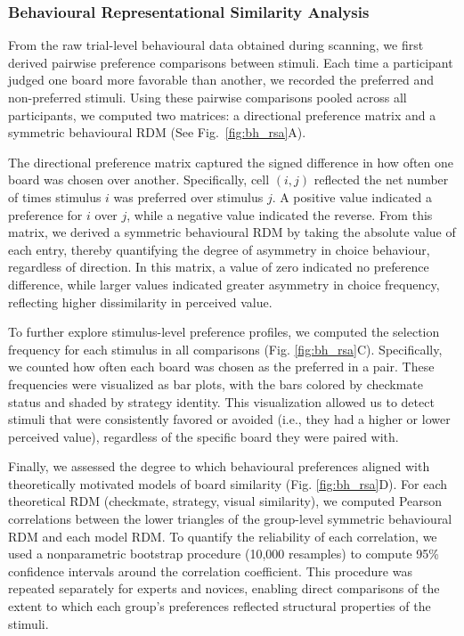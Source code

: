 \documentclass[preprint,12pt]{elsarticle}
\begin{document}
\subsubsection{Behavioural Representational Similarity Analysis}\label{sec:bh_rsa_section}
From the raw trial-level behavioural data obtained during scanning, we first derived pairwise preference comparisons between stimuli. Each time a participant judged one board more favorable than another, we recorded the preferred and non-preferred stimuli. Using these pairwise comparisons pooled across all participants, we computed two matrices: a directional preference matrix and a symmetric behavioural RDM (See Fig.~\ref{fig:bh_rsa}A).

The directional preference matrix captured the signed difference in how often one board was chosen over another. Specifically, cell $(i,j)$ reflected the net number of times stimulus $i$ was preferred over stimulus $j$. A positive value indicated a preference for $i$ over $j$, while a negative value indicated the reverse. From this matrix, we derived a symmetric behavioural RDM by taking the absolute value of each entry, thereby quantifying the degree of asymmetry in choice behaviour, regardless of direction. In this matrix, a value of zero indicated no preference difference, while larger values indicated greater asymmetry in choice frequency, reflecting higher dissimilarity in perceived value.

To further explore stimulus-level preference profiles, we computed the selection frequency for each stimulus in all comparisons (Fig. \ref{fig:bh_rsa}C). Specifically, we counted how often each board was chosen as the preferred in a pair. These frequencies were visualized as bar plots, with the bars colored by checkmate status and shaded by strategy identity. This visualization allowed us to detect stimuli that were consistently favored or avoided (i.e., they had a higher or lower perceived value), regardless of the specific board they were paired with.

Finally, we assessed the degree to which behavioural preferences aligned with theoretically motivated models of board similarity (Fig. \ref{fig:bh_rsa}D). For each theoretical RDM (checkmate, strategy, visual similarity), we computed Pearson correlations between the lower triangles of the group-level symmetric behavioural RDM and each model RDM. To quantify the reliability of each correlation, we used a nonparametric bootstrap procedure (10,000 resamples) to compute 95\% confidence intervals around the correlation coefficient. This procedure was repeated separately for experts and novices, enabling direct comparisons of the extent to which each group's preferences reflected structural properties of the stimuli.
\end{document}
